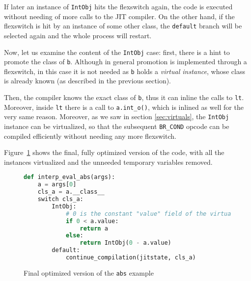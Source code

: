 If later an instance of \lstinline{IntObj} hits the flexswitch again, the
code is executed without needing of more calls to the JIT compiler.  On the
other hand, if the flexswitch is hit by an instance of some other class, the
\lstinline{default} branch will be selected again and the whole process will
restart.

Now, let us examine the content of the \lstinline{IntObj} case: first, there
is a hint to promote the class of \lstinline{b}.  Although in general
promotion is implemented through a flexswitch, in this case it is not needed
as \lstinline{b} holds a \emph{virtual instance}, whose class is already
known (as described in the previous section).

Then, the compiler knows the exact class of \lstinline{b}, thus it can inline
the calls to \lstinline{lt}.  Moreover, inside \lstinline{lt} there is a
call to \lstinline{a.int_o()}, which is inlined as well for the very same
reason.  Moreover, as we saw in section \ref{sec:virtuals}, the \lstinline{IntObj}
instance can be virtualized, so that the subsequent \lstinline{BR_COND} opcode
can be compiled efficiently without needing any more flexswitch.

Figure~\ref{fig:tlc-abs-final} shows the final, fully optimized version of the
code, with all the instances virtualized and the unneeded temporary variables
removed.

\begin{figure}[h]
\begin{center}
\begin{lstlisting}[language=Python]
def interp_eval_abs(args):
    a = args[0]
    cls_a = a.__class__
    switch cls_a:
        IntObj:
            # 0 is the constant "value" field of the virtualized IntObj(0)
            if 0 < a.value:
                return a
            else:
                return IntObj(0 - a.value)
        default: 
            continue_compilation(jitstate, cls_a)
\end{lstlisting}
\caption{Final optimized version of the \lstinline{abs} example}
\label{fig:tlc-abs-final}
\end{center}
\end{figure}
